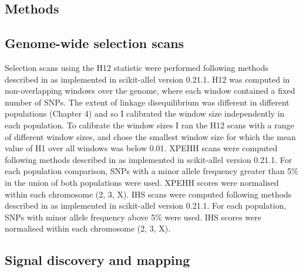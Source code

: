 \begin{refsection}
\section{Methods}\label{sec:ch5-methods}


\subsection{Genome-wide selection scans}\label{subsec:methods-gwss}


Selection scans using the H12 statistic were performed following methods described in \textcite{Garud2015} as implemented in scikit-allel version 0.21.1.
%
H12 was computed in non-overlapping windows over the genome, where each window contained a fixed number of SNPs.
%
The extent of linkage disequilibrium was different in different populations (Chapter 4) and so I calibrated the window size independently in each population.
%
To calibrate the window sizes I ran the H12 scans with a range of different window sizes, and chose the smallest window size for which the mean value of H1 over all windows was below 0.01.
%
XPEHH scans were computed following methods described in \textcite{Sabeti2007} as implemented in scikit-allel version 0.21.1.
%
For each population comparison, SNPs with a minor allele frequency greater than 5\% in the union of both populations were used.
%
XPEHH scores were normalised within each chromosome (2, 3, X).
%
IHS scans were computed following methods described in \textcite{Voight2006} as implemented in scikit-allel version 0.21.1.
%
For each population, SNPs with minor allele frequency above 5\% were used.
%
IHS scores were normalised within each chromosome (2, 3, X).


\subsection{Signal discovery and mapping}\label{subsec:methods-discovery}



\end{refsection}
